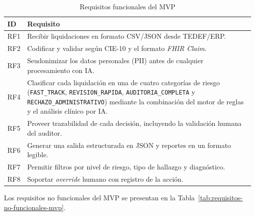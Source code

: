 \begin{table}[H]
    \centering
    \caption{Requisitos funcionales del MVP}
    \label{tab:requisitos-funcionales-mvp}

    \footnotesize
    \setlength{\tabcolsep}{8pt}
    \renewcommand{\arraystretch}{1.25}

    \begin{tabular}{
        p{}
        p{}
    }
        \toprule
        \textbf{ID}
        & \textbf{Requisito} \\
        \midrule

        RF1
        & Recibir liquidaciones en formato CSV/JSON desde TEDEF/ERP. \\

        RF2
        & Codificar y validar según CIE-10 y el formato
          \textit{FHIR Claim}. \\

        RF3
        & Seudonimizar los datos personales (PII) antes de cualquier
          procesamiento con IA. \\

        RF4
        & Clasificar cada liquidación en una de cuatro categorías de riesgo
          (\texttt{FAST\_TRACK}, \texttt{REVISION\_RAPIDA},
          \texttt{AUDITORIA\_COMPLETA} y
          \texttt{RECHAZO\_ADMINISTRATIVO}) mediante la combinación del
          motor de reglas y el análisis clínico por IA. \\

        RF5
        & Proveer trazabilidad de cada decisión, incluyendo la validación
          humana del auditor. \\

        RF6
        & Generar una salida estructurada en JSON y reportes en un formato
          legible. \\

        RF7
        & Permitir filtros por nivel de riesgo, tipo de hallazgo y
          diagnóstico. \\

        RF8
        & Soportar \textit{override} humano con registro de la acción. \\

        \bottomrule
    \end{tabular}
\end{table}

Los requisitos no funcionales del MVP se presentan en la
Tabla~\ref{tab:requisitos-no-funcionales-mvp}.

